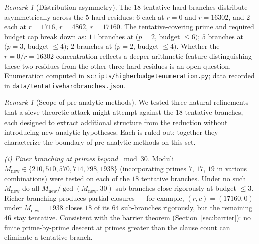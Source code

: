 \documentclass[11pt]{article}
\renewcommand{\_}{\origunderscore\allowbreak}
\theoremstyle{definition}
\theoremstyle{remark}
\newtheorem{remark}[theorem]{Remark}
\begin{document}
\begin{remark}[Distribution asymmetry]\label{rmk:asym}
The $18$ tentative hard branches distribute asymmetrically across
the $5$ hard residues: $6$ each at $r=0$ and $r=16302$, and $2$ each
at $r=1716$, $r=4862$, $r=17160$. The tentative-covering prime and
required budget cap break down as: $11$ branches at $(p=2$,
budget $\le 6)$; $5$ branches at $(p=3$, budget $\le 4)$; $2$
branches at $(p=2$, budget $\le 4)$. Whether the
$r=0 / r=16302$ concentration reflects a deeper arithmetic feature
distinguishing these two residues from the other three hard
residues is an open question. Enumeration computed in
\texttt{scripts/higher\_budget\_enumeration.py}; data recorded in
\texttt{data/tentative\_hard\_branches.json}.
\end{remark}

\begin{remark}[Scope of pre-analytic methods]\label{rmk:pre-analytic}
We tested three natural refinements that a sieve-theoretic attack
might attempt against the $18$ tentative branches, each designed to
extract additional structure from the reduction without introducing
new analytic hypotheses. Each is ruled out; together they
characterize the boundary of pre-analytic methods on this set.

\emph{(i) Finer branching at primes beyond $\bmod 30$.} Moduli
$M_{\mathrm{new}} \in \{210, 510, 570, 714, 798, 1938\}$
(incorporating primes $7$, $17$, $19$ in various combinations) were
tested on each of the $18$ tentative branches. Under no such
$M_{\mathrm{new}}$ do all $M_{\mathrm{new}}/\gcd(M_{\mathrm{new}},30)$
sub-branches close rigorously at budget $\le 3$. Richer branching
produces partial closures — for example, $(r, c) = (17160, 0)$ under
$M_{\mathrm{new}} = 1938$ closes $18$ of its $64$ sub-branches
rigorously, but the remaining $46$ stay tentative. Consistent with
the barrier theorem (Section~\ref{sec:barrier}): no finite
prime-by-prime descent at primes greater than the clause count
can eliminate a tentative branch.


\end{remark}
\end{document}
